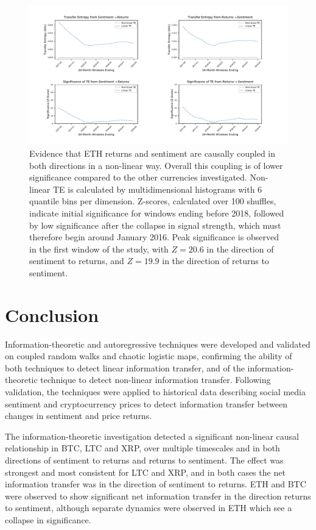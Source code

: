 \documentclass[]{rsos}%
\begin{document}
{\begin{figure}[!htbp]
    \includegraphics[width=\linewidth]{images/ETH.pdf} 
    \caption{Evidence that ETH returns and sentiment are causally coupled in both directions in a non-linear way. Overall this coupling is of lower significance compared to the other currencies investigated. Non-linear TE is calculated by multidimensional histograms with 6 quantile bins per dimension. Z-scores, calculated over 100 shuffles, indicate initial significance for windows ending before 2018, followed by low significance after the collapse in signal strength, which must therefore begin around January 2016. Peak significance is observed in the first window of the study, with $Z=20.6$ in the direction of sentiment to returns, and $Z=19.9$ in the direction of returns to sentiment.     
  }
  \label{fig:ETH_TE}
  \vspace{-34pt}
  \end{figure}
  
 
\clearpage
\section{Conclusion} \label{s.conclusions}

Information-theoretic and autoregressive techniques were developed and validated on coupled random walks and chaotic logistic maps, confirming the ability of both techniques to detect linear information transfer, and of the information-theoretic technique to detect non-linear information transfer. Following validation, the techniques were applied to historical data describing social media sentiment and cryptocurrency prices to detect information transfer between changes in sentiment and price returns. 

The information-theoretic investigation detected a significant non-linear causal relationship in BTC, LTC and XRP, over multiple timescales and in both directions of sentiment to returns and returns to sentiment. The effect was strongest and most consistent for LTC and XRP, and in both cases the net information transfer was in the direction of sentiment to returns. ETH and BTC were observed to show significant net information transfer in the direction returns to sentiment, although separate dynamics were observed in ETH which see a collapse in significance. 

}
\end{document}
